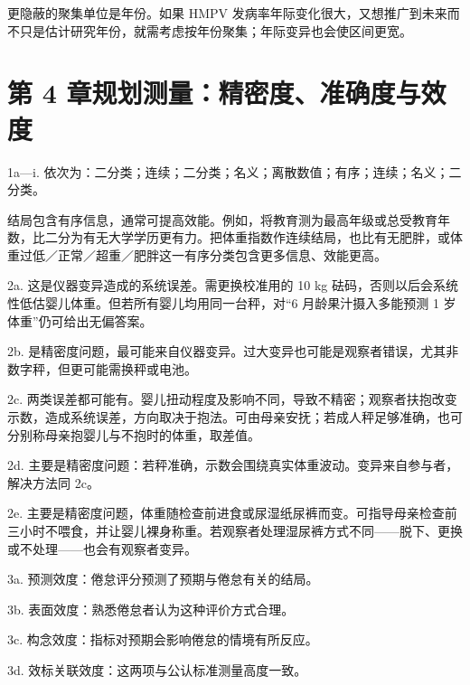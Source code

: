 \begin{answerlist}
更隐蔽的聚集单位是年份。如果 HMPV 发病率年际变化很大，又想推广到未来而不只是估计研究年份，就需考虑按年份聚集；年际变异也会使区间更宽。
\end{answerlist}

\section{第 4 章\quad 规划测量：精密度、准确度与效度}
\begin{answerlist}
\item[1a—i.] 依次为：二分类；连续；二分类；名义；离散数值；有序；连续；名义；二分类。
\end{answerlist}
结局包含有序信息，通常可提高效能。例如，将教育测为最高年级或总受教育年数，比二分为有无大学学历更有力。把体重指数作连续结局，也比有无肥胖，或体重过低／正常／超重／肥胖这一有序分类包含更多信息、效能更高。
\begin{answerlist}
\item[2a.] 这是仪器变异造成的系统误差。需更换校准用的 10 kg 砝码，否则以后会系统性低估婴儿体重。但若所有婴儿均用同一台秤，对“6 月龄果汁摄入多能预测 1 岁体重”仍可给出无偏答案。
\item[2b.] 是精密度问题，最可能来自仪器变异。过大变异也可能是观察者错误，尤其非数字秤，但更可能需换秤或电池。
\item[2c.] 两类误差都可能有。婴儿扭动程度及影响不同，导致不精密；观察者扶抱改变示数，造成系统误差，方向取决于抱法。可由母亲安抚；若成人秤足够准确，也可分别称母亲抱婴儿与不抱时的体重，取差值。
\item[2d.] 主要是精密度问题：若秤准确，示数会围绕真实体重波动。变异来自参与者，解决方法同 2c。
\item[2e.] 主要是精密度问题，体重随检查前进食或尿湿纸尿裤而变。可指导母亲检查前三小时不喂食，并让婴儿裸身称重。若观察者处理湿尿裤方式不同——脱下、更换或不处理——也会有观察者变异。
\item[3a.] 预测效度：倦怠评分预测了预期与倦怠有关的结局。
\item[3b.] 表面效度：熟悉倦怠者认为这种评价方式合理。
\item[3c.] 构念效度：指标对预期会影响倦怠的情境有所反应。
\item[3d.] 效标关联效度：这两项与公认标准测量高度一致。
\end{answerlist}

